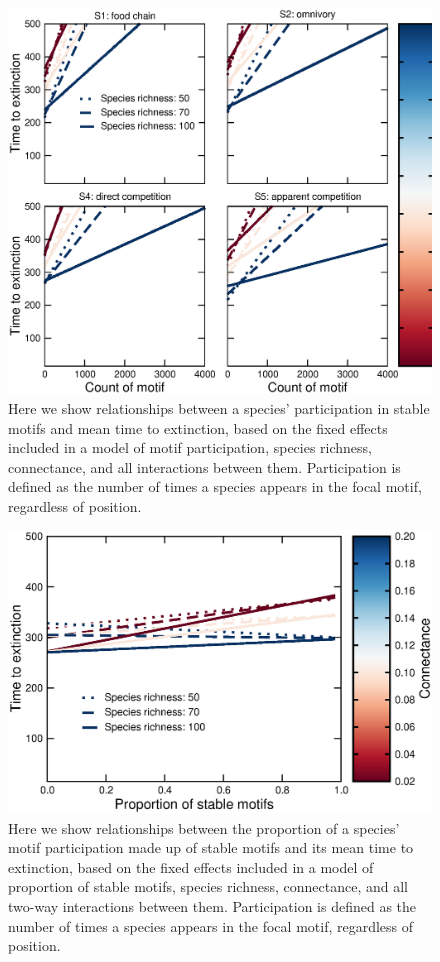 \documentclass[12pt]{article}
\begin{document}
	\begin{figure}[h!]
		\caption{Here we show relationships between a species' participation in stable motifs and mean time to extinction, based on the fixed effects included in a model of motif participation, species richness, connectance, and all interactions between them. Participation is defined as the number of times a species appears in the focal motif, regardless of position.}
		\label{participation_lmers}
		\includegraphics[width=\textwidth]{figures/extinction_order/motif_lmer_summary_paper_full.eps}
		\end{figure}

	\begin{figure}[h!]
		\caption{Here we show relationships between the proportion of a species' motif participation made up of stable motifs and its mean time to extinction, based on the fixed effects included in a model of proportion of stable motifs, species richness, connectance, and all two-way interactions between them. Participation is defined as the number of times a species appears in the focal motif, regardless of position.}
		\label{proportion_fig}
		\includegraphics[width=\textwidth]{figures/extinction_order/proportion_stable_summary_paper_full.eps}
		\end{figure}
\end{document}
